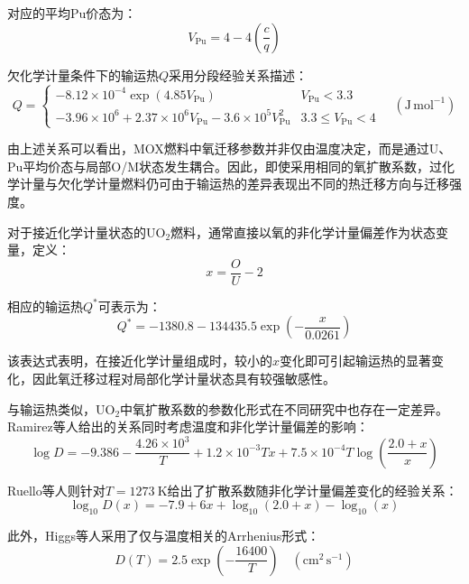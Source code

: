 对应的平均Pu价态为：
\begin{equation}
	V_{\mathrm{Pu}}
	=
	4-
	4\left(
	\frac{c}{q}
	\right)
\end{equation}

欠化学计量条件下的输运热$Q$采用分段经验关系描述：
\begin{equation}
	Q=
	\begin{cases}
		-8.12\times10^{-4}
		\exp\left(4.85V_{\mathrm{Pu}}\right)
		& V_{\mathrm{Pu}}<3.3 \\[6pt]
		-3.96\times10^{6}
		+
		2.37\times10^{6}V_{\mathrm{Pu}}
		-
		3.6\times10^{5}V_{\mathrm{Pu}}^{2}
		& 3.3\leq V_{\mathrm{Pu}}<4
	\end{cases}
	\quad
	\left(\mathrm{J\,mol^{-1}}\right)
\end{equation}

由上述关系可以看出，MOX燃料中氧迁移参数并非仅由温度决定，而是通过U、Pu平均价态与局部O/M状态发生耦合。因此，即使采用相同的氧扩散系数，过化学计量与欠化学计量燃料仍可由于输运热的差异表现出不同的热迁移方向与迁移强度。

对于接近化学计量状态的UO$_2$燃料，通常直接以氧的非化学计量偏差作为状态变量，定义：
\begin{equation}
	x=\frac{O}{U}-2 
\end{equation}

相应的输运热$Q^{*}$可表示为：
\begin{equation}
	Q^{*}
	=
	-1380.8
	-
	134435.5
	\exp\left(
	-\frac{x}{0.0261}
	\right)
\end{equation}

该表达式表明，在接近化学计量组成时，较小的$x$变化即可引起输运热的显著变化，因此氧迁移过程对局部化学计量状态具有较强敏感性。

与输运热类似，UO$_2$中氧扩散系数的参数化形式在不同研究中也存在一定差异。Ramirez等人\cite{ramirezSimulationsHeatOxygen2006}给出的关系同时考虑温度和非化学计量偏差的影响：
\begin{equation}
	\log D
	=
	-9.386
	-
	\frac{4.26\times10^{3}}{T}
	+
	1.2\times10^{-3}Tx
	+
	7.5\times10^{-4}T
	\log\left(
	\frac{2.0+x}{x}
	\right)
\end{equation}

Ruello等人\cite{ruelloChemicalDiffusionUranium2004}则针对$T=1273~\mathrm{K}$给出了扩散系数随非化学计量偏差变化的经验关系：
\begin{equation}
	\log_{10}D(x)
	=
	-7.9
	+
	6x
	+
	\log_{10}(2.0+x)
	-
	\log_{10}(x)
\end{equation}

此外，Higgs等人\cite{higgsConceptualModelFuel2007}采用了仅与温度相关的Arrhenius形式：
\begin{equation}
	D(T)
	=
	2.5
	\exp\left(
	-\frac{16400}{T}
	\right)
	\quad
	\left(\mathrm{cm^2\,s^{-1}}\right)
\end{equation}

